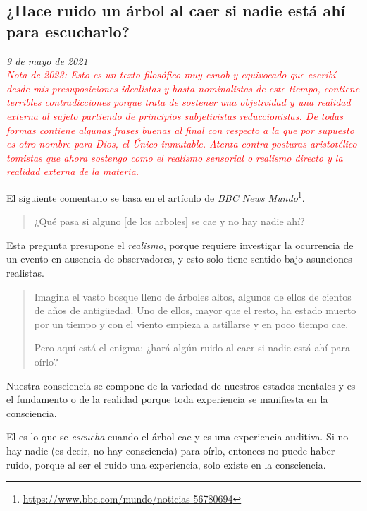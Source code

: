 \documentclass[12pt]{article}
\begin{document}
	\newpage

	\subsection{¿Hace ruido un árbol al caer si nadie está ahí para
	escucharlo?}

	\textit{9 de mayo de 2021}\\

	\textcolor{red}{\textit{Nota de 2023: Esto es un texto filosófico muy
	esnob y equivocado que escribí desde mis presuposiciones idealistas y
	hasta nominalistas de este tiempo, contiene
	\textit{terribles contradicciones} porque trata de
	sostener una objetividad y una realidad externa al sujeto partiendo de
	principios subjetivistas reduccionistas. De todas formas contiene
	algunas frases buenas al final con respecto a la
	 que por supuesto es otro nombre para
	Dios, el Único inmutable. Atenta contra posturas aristotélico-tomistas
	que ahora sostengo como el realismo sensorial o realismo directo y la
	realidad externa de la materia.}}

	El siguiente comentario se basa en el artículo  de \textit{BBC News Mundo}\footnote{
		\url{https://www.bbc.com/mundo/noticias-56780694}}.


	\blockquote[]{¿Qué pasa si alguno [de los arboles] se cae y no hay nadie
	ahí?}

	Esta pregunta presupone el \textit{realismo}, porque requiere investigar
	la ocurrencia de un evento en ausencia de observadores, y esto solo
	tiene sentido bajo asunciones realistas.

	\blockquote[]{Imagina el vasto bosque lleno de árboles altos, algunos de
	ellos de cientos de años de antigüedad. Uno de ellos, mayor que el
	resto, ha estado muerto por un tiempo y con el viento empieza a
	astillarse y en poco tiempo cae.

	Pero aquí está el enigma: ¿hará algún ruido al caer si nadie está ahí
	para oírlo?}
	
	Nuestra	 consciencia se compone de la variedad de nuestros estados
	mentales y es el fundamento o  de la realidad
	porque toda experiencia se manifiesta en la consciencia.
	
	El  es lo que se \textit{escucha} cuando el árbol cae y
	es una experiencia auditiva. Si no hay nadie (es decir, no hay
	consciencia) para oírlo, entonces no puede haber ruido, porque al ser el
	ruido una experiencia, solo existe en la consciencia.
	
\end{document}
